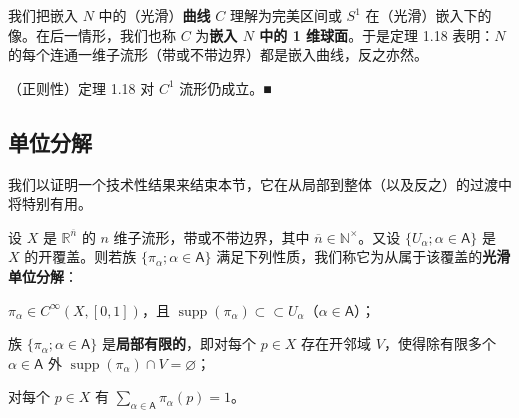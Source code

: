 \begin{remark}

\begin{items}
\item

我们把嵌入 $ N $ 中的（光滑）\textbf{曲线} $ C $ 理解为完美区间或 $ S^{1} $ 在（光滑）嵌入下的像。在后一情形，我们也称 $ C $ 为\textbf{嵌入 $ N $ 中的 1 维球面}。于是定理 1.18 表明：$ N $ 的每个连通一维子流形（带或不带边界）都是嵌入曲线，反之亦然。

\item

（正则性）定理 1.18 对 $ C^{1} $ 流形仍成立。\nobreak\hspace{0.35em}■

\end{items}

\end{remark}

\subsection*{单位分解}

我们以证明一个技术性结果来结束本节，它在从局部到整体（以及反之）的过渡中将特别有用。

设 $ X $ 是 $ \mathbb{R}^{\overline{n}} $ 的 $ n $ 维子流形，带或不带边界，其中 $ \overline{n} \in \mathbb{N}^{\times} $。又设 $ \{U_{\alpha} ; \alpha \in \mathsf{A}\} $ 是 $ X $ 的开覆盖。则若族 $ \{\pi_{\alpha} ; \alpha \in \mathsf{A}\} $ 满足下列性质，我们称它为从属于该覆盖的\textbf{光滑单位分解}：

\begin{subitems}
\item

$ \pi_{\alpha} \in C^{\infty}(X, [0, 1]) $，且 $ \operatorname{supp}(\pi_{\alpha}) \subset\subset U_{\alpha} $（$ \alpha \in \mathsf{A} $）；

\item

族 $ \{\pi_{\alpha} ; \alpha \in \mathsf{A}\} $ 是\textbf{局部有限的}，即对每个 $ p \in X $ 存在开邻域 $ V $，使得除有限多个 $ \alpha \in \mathsf{A} $ 外 $ \operatorname{supp}(\pi_{\alpha}) \cap V = \varnothing $；

\item

对每个 $ p \in X $ 有 $ \sum_{\alpha \in \mathsf{A}} \pi_{\alpha}(p) = 1 $。

\end{subitems}

